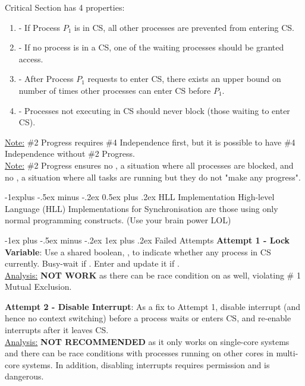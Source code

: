 \documentclass[10pt,landscape,letterpaper]{article}
\makeatletter
\renewcommand{\subsection}{\@startsection{subsection}{2}{0mm}%
                                {-1explus -.5ex minus -.2ex}%
                                {0.5ex plus .2ex}%
                                {\sffamily\normalsize\itshape}}
\renewcommand{\subsubsection}{\@startsection{subsubsection}{3}{0mm}%
                                {-1ex plus -.5ex minus -.2ex}%
                                {1ex plus .2ex}%
                                {\normalfont\small\itshape}}
\makeatother
\begin{document}
\begin{multicols}{3}
\medskip

Critical Section has 4 properties:
\begin{enumerate}
    \item {} - If Process $P_1$ is in CS, all other processes are prevented from entering CS.
    \item {} - If no process is in a CS, one of the waiting processes should be granted access.
    \item {} - After Process $P_1$ requests to enter CS, there exists an upper bound on number of times other processes can enter CS before $P_1$.
    \item {} - Processes not executing in CS should never block (those waiting to enter CS).
\end{enumerate}
\underline{Note:} \#2 Progress requires \#4 Independence first, but it is possible to have \#4 Independence without \#2 Progress.
\\
\underline{Note:} \#2 Progress ensures no , a situation where all processes are blocked, and no , a situation where all tasks are running but they do not "make any progress".


\subsection{HLL Implementation}
High-level Language (HLL) Implementations for Synchronisation are those using only normal programming constructs. (Use your brain power LOL)


\subsubsection{Failed Attempts}
\textbf{Attempt 1 - Lock Variable}: Use a shared boolean, , to indicate whether any process in CS currently. Busy-wait if . Enter and update it if .
\\
\underline{Analysis:} \textbf{NOT WORK} as there can be race condition on  as well, violating \# 1 Mutual Exclusion.

\medskip

\textbf{Attempt 2 - Disable Interrupt}: As a fix to Attempt 1, disable interrupt (and hence no context switching) before a process waits or enters CS, and re-enable interrupts after it leaves CS.
\\
\underline{Analysis:} \textbf{NOT RECOMMENDED} as it only works on single-core systems and there can be race conditions with processes running on other cores in multi-core systems. In addition, disabling interrupts requires permission and is dangerous.


\end{multicols}
\end{document}

